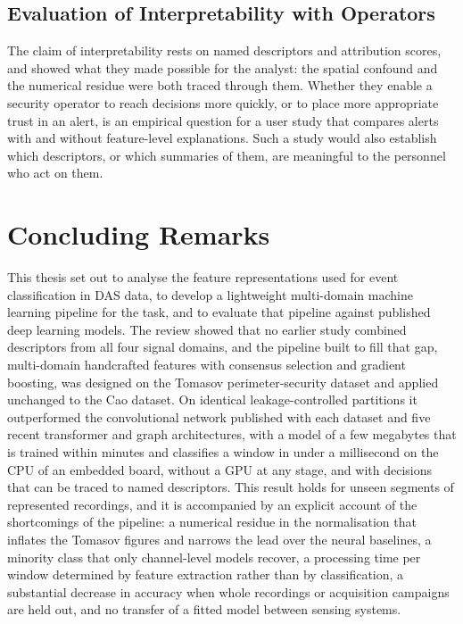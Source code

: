 \subsection{Evaluation of Interpretability with Operators}
\label{sec:chap5FutureOperators}
The claim of interpretability rests on named descriptors and attribution scores, and  showed what they made possible for the analyst: the spatial confound and the numerical residue were both traced through them. Whether they enable a security operator to reach decisions more quickly, or to place more appropriate trust in an alert, is an empirical question for a user study that compares alerts with and without feature-level explanations. Such a study would also establish which descriptors, or which summaries of them, are meaningful to the personnel who act on them.

\section{Concluding Remarks}
\label{sec:chap5Closing}
This thesis set out to analyse the feature representations used for event classification in DAS data, to develop a lightweight multi-domain machine learning pipeline for the task, and to evaluate that pipeline against published deep learning models. The review showed that no earlier study combined descriptors from all four signal domains, and the pipeline built to fill that gap, multi-domain handcrafted features with consensus selection and gradient boosting, was designed on the Tomasov perimeter-security dataset and applied unchanged to the Cao dataset. On identical leakage-controlled partitions it outperformed the convolutional network published with each dataset and five recent transformer and graph architectures, with a model of a few megabytes that is trained within minutes and classifies a window in under a millisecond on the CPU of an embedded board, without a GPU at any stage, and with decisions that can be traced to named descriptors. This result holds for unseen segments of represented recordings, and it is accompanied by an explicit account of the shortcomings of the pipeline: a numerical residue in the normalisation that inflates the Tomasov figures and narrows the lead over the neural baselines, a minority class that only channel-level models recover, a processing time per window determined by feature extraction rather than by classification, a substantial decrease in accuracy when whole recordings or acquisition campaigns are held out, and no transfer of a fitted model between sensing systems.

